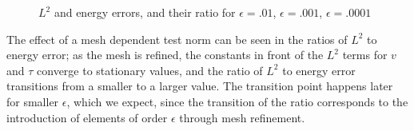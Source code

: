 \documentclass[11pt,onecolumn]{scrartcl}
\begin{document}
\begin{figure}[h!]
\centering
{}
\caption{$L^2$ and energy errors, and their ratio for $\epsilon=.01$, $\epsilon=.001$, $\epsilon=.0001$}
\label{ratios_simple}
\end{figure}
The effect of a mesh dependent test norm can be seen in the ratios of $L^2$ to energy error; as the mesh is refined, the constants in front of the $L^2$ terms for $v$ and $\tau$ converge to stationary values, and the ratio of $L^2$ to energy error transitions from a smaller to a larger value.  The transition point happens later for smaller $\epsilon$, which we expect, since the transition of the ratio corresponds to the introduction of elements of order $\epsilon$ through mesh refinement. 
\end{document}
